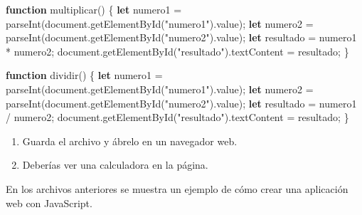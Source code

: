 \documentclass[
  a4paper,
  DIV=11,
  numbers=noendperiod,
  onepage,
  openany]{scrreprt}
\newenvironment{Shaded}{\begin{snugshade}}{\end{snugshade}}
\newcommand{\AttributeTok}[1]{\textcolor[rgb]{0.40,0.45,0.13}{#1}}
\newcommand{\BuiltInTok}[1]{\textcolor[rgb]{0.00,0.23,0.31}{#1}}
\newcommand{\FunctionTok}[1]{\textcolor[rgb]{0.28,0.35,0.67}{#1}}
\newcommand{\KeywordTok}[1]{\textcolor[rgb]{0.00,0.23,0.31}{\textbf{#1}}}
\newcommand{\NormalTok}[1]{\textcolor[rgb]{0.00,0.23,0.31}{#1}}
\newcommand{\OperatorTok}[1]{\textcolor[rgb]{0.37,0.37,0.37}{#1}}
\newcommand{\PreprocessorTok}[1]{\textcolor[rgb]{0.68,0.00,0.00}{#1}}
\newcommand{\StringTok}[1]{\textcolor[rgb]{0.13,0.47,0.30}{#1}}
\begin{document}
\begin{tcolorbox}
\begin{Shaded}
\begin{Highlighting}[]
\KeywordTok{function} \FunctionTok{multiplicar}\NormalTok{() \{}
    \KeywordTok{let}\NormalTok{ numero1 }\OperatorTok{=} \PreprocessorTok{parseInt}\NormalTok{(}\BuiltInTok{document}\OperatorTok{.}\FunctionTok{getElementById}\NormalTok{(}\StringTok{"numero1"}\NormalTok{)}\OperatorTok{.}\AttributeTok{value}\NormalTok{)}\OperatorTok{;}
    \KeywordTok{let}\NormalTok{ numero2 }\OperatorTok{=} \PreprocessorTok{parseInt}\NormalTok{(}\BuiltInTok{document}\OperatorTok{.}\FunctionTok{getElementById}\NormalTok{(}\StringTok{"numero2"}\NormalTok{)}\OperatorTok{.}\AttributeTok{value}\NormalTok{)}\OperatorTok{;}
    \KeywordTok{let}\NormalTok{ resultado }\OperatorTok{=}\NormalTok{ numero1 }\OperatorTok{*}\NormalTok{ numero2}\OperatorTok{;}
    \BuiltInTok{document}\OperatorTok{.}\FunctionTok{getElementById}\NormalTok{(}\StringTok{"resultado"}\NormalTok{)}\OperatorTok{.}\AttributeTok{textContent} \OperatorTok{=}\NormalTok{ resultado}\OperatorTok{;}
\NormalTok{\}}

\KeywordTok{function} \FunctionTok{dividir}\NormalTok{() \{}
    \KeywordTok{let}\NormalTok{ numero1 }\OperatorTok{=} \PreprocessorTok{parseInt}\NormalTok{(}\BuiltInTok{document}\OperatorTok{.}\FunctionTok{getElementById}\NormalTok{(}\StringTok{"numero1"}\NormalTok{)}\OperatorTok{.}\AttributeTok{value}\NormalTok{)}\OperatorTok{;}
    \KeywordTok{let}\NormalTok{ numero2 }\OperatorTok{=} \PreprocessorTok{parseInt}\NormalTok{(}\BuiltInTok{document}\OperatorTok{.}\FunctionTok{getElementById}\NormalTok{(}\StringTok{"numero2"}\NormalTok{)}\OperatorTok{.}\AttributeTok{value}\NormalTok{)}\OperatorTok{;}
    \KeywordTok{let}\NormalTok{ resultado }\OperatorTok{=}\NormalTok{ numero1 }\OperatorTok{/}\NormalTok{ numero2}\OperatorTok{;}
    \BuiltInTok{document}\OperatorTok{.}\FunctionTok{getElementById}\NormalTok{(}\StringTok{"resultado"}\NormalTok{)}\OperatorTok{.}\AttributeTok{textContent} \OperatorTok{=}\NormalTok{ resultado}\OperatorTok{;}
\NormalTok{\}}
\end{Highlighting}
\end{Shaded}

\begin{enumerate}
\def\labelenumi{\arabic{enumi}.}
\setcounter{enumi}{4}
\item
  Guarda el archivo y ábrelo en un navegador web.
\item
  Deberías ver una calculadora en la página.
\end{enumerate}

En los archivos anteriores se muestra un ejemplo de cómo crear una
aplicación web con JavaScript.


\end{tcolorbox}
\end{document}
